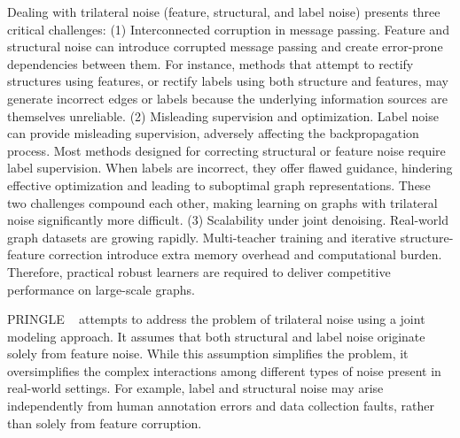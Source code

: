 \documentclass[sigconf, anonymous, review]{acmart}
\begin{document}
  Dealing with trilateral noise (feature, structural, and label noise) presents three critical challenges:
  (1) Interconnected corruption in message passing. Feature and structural noise can introduce corrupted message passing and create error-prone dependencies between them. For instance, methods that attempt to rectify structures using features, or rectify labels using both structure and features, may generate incorrect edges or labels because the underlying information sources are themselves unreliable.
  (2) Misleading supervision and optimization. Label noise can provide misleading supervision, adversely affecting the backpropagation process. Most methods designed for correcting structural or feature noise require label supervision. When labels are incorrect, they offer flawed guidance, hindering effective optimization and leading to suboptimal graph representations. These two challenges compound each other, making learning on graphs with trilateral noise significantly more difficult.
  (3) Scalability under joint denoising. Real-world graph datasets are growing rapidly. Multi-teacher training and iterative structure-feature correction introduce extra memory overhead and computational burden. Therefore, practical robust learners are required to deliver competitive performance on large-scale graphs.



  PRINGLE ~\cite{in2024noise} attempts to address the problem of trilateral noise using a joint modeling approach. It assumes that both structural and label noise originate solely from feature noise. While this assumption simplifies the problem, it oversimplifies the complex interactions among different types of noise present in real-world settings. For example, label and structural noise may arise independently from human annotation errors and data collection faults, rather than solely from feature corruption.
\end{document}
